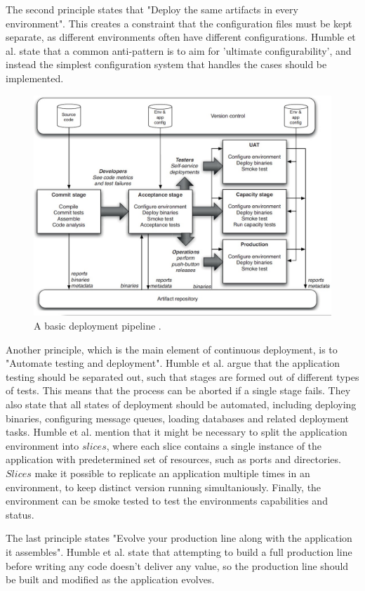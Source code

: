 \documentclass[english]{tktltiki2}
\theoremstyle{definition}
\theoremstyle{remark}
\begin{document}
The second principle states that "Deploy the same artifacts in every environment". This creates a constraint that the configuration files must be kept separate, as different environments often have different configurations. Humble et al. state that a common anti-pattern is to aim for 'ultimate configurability', and instead the simplest configuration system that handles the cases should be implemented.
\begin{figure}[h]
	\centering
	\includegraphics[width=5.0in]{pipeline.jpg}
	\caption{A basic deployment pipeline \cite{cdbook}.}
	\label{fig3}
\end{figure}
Another principle, which is the main element of continuous deployment, is to "Automate testing and deployment". Humble et al. argue that the application testing should be separated out, such that stages are formed out of different types of tests. This means that the process can be aborted if a single stage fails. They also state that all states of deployment should be automated, including deploying binaries, configuring message queues, loading databases and related deployment tasks. Humble et al. mention that it might be necessary to split the application environment into $slices$, where each slice contains a single instance of the application with predetermined set of resources, such as ports and directories. $Slices$ make it possible to replicate an application multiple times in an environment, to keep distinct version running simultaniously. Finally, the environment can be smoke tested to test the environments capabilities and status.

The last principle states "Evolve your production line along with the application it assembles". Humble et al. state that attempting to build a full production line before writing any code doesn't deliver any value, so the production line should be built and modified as the application evolves. 
\end{document}

